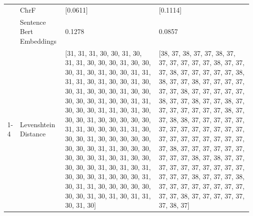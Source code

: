 \begin{tabular}{llll}
 & ChrF & [0.0611] & [0.1114] \\
 & Sentence Bert Embeddings & 0.1278 & 0.0857 \\
\cline{1-4}
\multirow[t]{4}{*}{Engalo ensa zigwanira nyini zo.} & Levenshtein Distance & [31, 31, 31, 30, 30, 31, 30, 31, 31, 30, 30, 30, 31, 30, 30, 30, 31, 30, 31, 30, 30, 31, 31, 31, 31, 30, 31, 30, 30, 31, 30, 30, 31, 30, 30, 30, 31, 30, 30, 30, 30, 30, 31, 30, 30, 31, 31, 30, 30, 30, 31, 31, 30, 31, 30, 30, 30, 31, 30, 30, 30, 30, 30, 31, 31, 30, 30, 30, 31, 31, 30, 30, 30, 31, 30, 30, 30, 30, 30, 30, 30, 30, 31, 31, 30, 30, 30, 30, 30, 30, 31, 30, 31, 30, 30, 30, 30, 30, 31, 30, 31, 30, 31, 30, 30, 30, 31, 30, 30, 30, 31, 30, 31, 31, 30, 30, 30, 30, 30, 30, 30, 31, 30, 31, 30, 31, 31, 30, 31, 30] & [38, 37, 38, 37, 37, 38, 37, 37, 37, 37, 37, 37, 38, 37, 37, 37, 38, 37, 37, 37, 37, 37, 38, 38, 37, 37, 38, 37, 37, 37, 37, 37, 37, 38, 37, 37, 37, 37, 37, 38, 37, 37, 38, 37, 37, 38, 37, 37, 37, 37, 37, 37, 37, 38, 37, 37, 38, 38, 37, 37, 37, 37, 37, 37, 37, 37, 37, 37, 37, 37, 37, 37, 37, 37, 37, 37, 37, 37, 37, 37, 38, 37, 37, 37, 37, 37, 37, 37, 37, 37, 38, 37, 38, 37, 37, 37, 37, 37, 37, 37, 37, 37, 37, 37, 37, 37, 38, 37, 37, 37, 38, 37, 37, 37, 37, 37, 37, 37, 37, 37, 37, 38, 37, 37, 37, 37, 37, 37, 38, 37] \\

\end{tabular}
